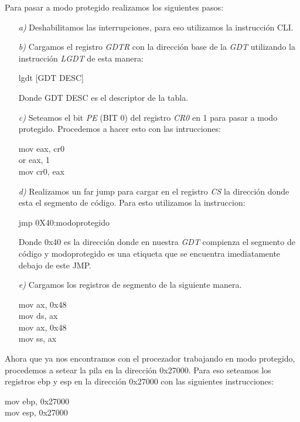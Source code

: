 Para pasar a modo protegido realizamos los siguientes pasos:

\begin{itemize}
\item [\textit{a)}] Deshabilitamos las interrupciones, para eso utilizamos la instrucción CLI.

\item [\textit{b)}] Cargamos el registro \textit{GDTR} con la dirección base de la \textit{\textit{GDT}} utilizando la instrucción \textit{LGDT} de esta manera: 
\begin{center}
lgdt [GDT DESC]
\end{center}
Donde GDT DESC es el descriptor de la tabla.

 \item [\textit{c)}] Seteamos el bit \textit{PE} (BIT 0) del registro \textit{CR0} en 1 para pasar a modo protegido. Procedemos a hacer esto con las intrucciones:
\begin{center}
      mov eax, cr0\\
     or eax, 1   $~~~~$ \\
       mov cr0, eax
    \end{center}

\item [\textit{d)}]Realizamos un far jump para cargar en el registro \textit{CS} la dirección donde esta el segmento de código. Para esto utilizamos la instruccion: 

\begin{center}
jmp 0X40:modoprotegido
\end{center}

Donde 0x40 es la dirección donde en nuestra \textit{GDT} compienza el segmento de código y modoprotegido es una etiqueta que se encuentra imediatamente debajo de este JMP. 

\item [\textit{e)}]Cargamos los registros de segmento de la siguiente manera.

\begin{center}
   mov ax, 0x48\\
    mov ds, ax$~~~$\\
    mov ax, 0x48\\
    mov ss, ax$~~~$\\
\end{center}


\end{itemize}

Ahora que ya nos encontramos con el procezador trabajando en modo protegido, procedemos a setear la pila en la dirección 0x27000. Para eso seteamos los registros ebp y esp en la dirección 0x27000 con las siguientes instrucciones: 
\begin{center}
mov ebp, 0x27000\\
mov esp, 0x27000\\
\end{center}

